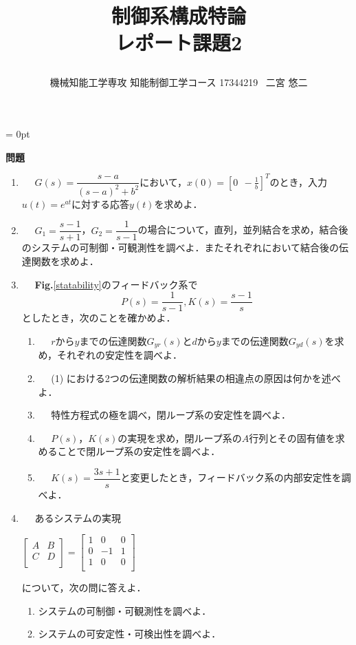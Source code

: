 \documentclass[a4paper,11pt]{jarticle}
\title{\vspace{-20truemm}
{\normalsize \rightline{平成29年\ 7月\ 28日}}
{\large 制御系構成特論\\}
レポート課題2\\
\date{}
\vspace{-2truemm}}
\author{機械知能工学専攻 知能制御工学コース \hspace{3mm} 17344219 \ 二宮 悠二}
\begin{document}
\parindent = 0pt %
\titlepage
\maketitle
{\Large{\bf 問題}}
\vspace{2mm}
\begin{enumerate}
 \item ~~ $ G(s) = \dfrac{s-a}{(s-a)^2 + b^2} $において，$ x(0) = \left[ 0 ~~ - \frac{1}{b} \right]^T $のとき，入力$ u(t) = e^{at} $に対する応答$ y(t) $を求めよ．
 \item ~~ $ G_1 = \dfrac{s-1}{s+1} $，$ G_2 = \dfrac{1}{s-1} $の場合について，直列，並列結合を求め，結合後のシステムの可制御・可観測性を調べよ．またそれぞれにおいて結合後の伝達関数を求めよ．
 \item ~~ {\bf Fig.}{\ref{statability}}のフィードバック系で
  \begin{equation}
   P(s) = \dfrac{1}{s-1} , K(s) = \dfrac{s-1}{s} \nonumber
  \end{equation}
 としたとき，次のことを確かめよ．
  \begin{enumerate}[(1)]
   \setlength{\leftskip}{2mm}
   \item ~~ $ r $から$ y $までの伝達関数$ G_{yr}(s) $と$ d $から$ y $までの伝達関数$ G_{yd} (s) $を求め，それぞれの安定性を調べよ．
   \item ~~ (1) における2つの伝達関数の解析結果の相違点の原因は何かを述べよ．
   \item ~~ 特性方程式の極を調べ，閉ループ系の安定性を調べよ．
   \item ~~ $ P(s) $，$ K(s) $の実現を求め，閉ループ系の$ A $行列とその固有値を求めることで閉ループ系の安定性を調べよ．
   \item ~~ $ K(s) = \dfrac{3s+1}{s} $と変更したとき，フィードバック系の内部安定性を調べよ．
  \end{enumerate}
 \item ~~ あるシステムの実現
  \begin{center}
   $\left[
  \begin{array}{c|c}
   A & B \\ \hline
   C & D \\
  \end{array}
  \right] = \left[
  \begin{array}{cc|c}
   1 & 0 & 0 \\
   0 & -1 & 1 \\ \hline
   1 & 0 & 0 \\
  \end{array}
  \right]$
  \end{center}
 について，次の問に答えよ．
  \begin{enumerate}[(1)]
   \setlength{\leftskip}{2mm}
   \item システムの可制御・可観測性を調べよ．
   \item システムの可安定性・可検出性を調べよ．
  \end{enumerate}
\end{enumerate}
\end{document}
